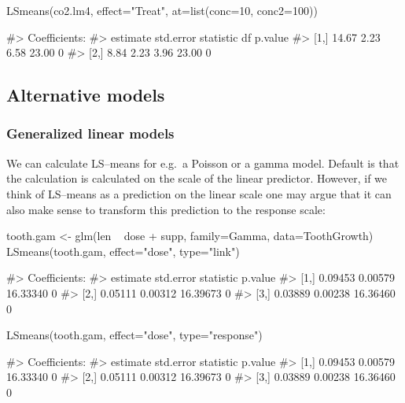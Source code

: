 \begin{Schunk}
\begin{Sinput}
LSmeans(co2.lm4, effect="Treat", at=list(conc=10, conc2=100))
\end{Sinput}
\begin{Soutput}
#> Coefficients:
#>      estimate std.error statistic    df p.value
#> [1,]    14.67      2.23      6.58 23.00       0
#> [2,]     8.84      2.23      3.96 23.00       0
\end{Soutput}
\end{Schunk}

\hypertarget{alternative-models}{%
\subsection{Alternative models}\label{alternative-models}}

\hypertarget{generalized-linear-models}{%
\subsubsection{Generalized linear
models}\label{generalized-linear-models}}

We can calculate LS--means for e.g.~a Poisson or a gamma model. Default
is that the calculation is calculated on the scale of the linear
predictor. However, if we think of LS--means as a prediction on the
linear scale one may argue that it can also make sense to transform this
prediction to the response scale:

\begin{Schunk}
\begin{Sinput}
tooth.gam <- glm(len ~ dose + supp, family=Gamma, data=ToothGrowth)
LSmeans(tooth.gam, effect="dose", type="link")
\end{Sinput}
\begin{Soutput}
#> Coefficients:
#>      estimate std.error statistic p.value
#> [1,]  0.09453   0.00579  16.33340       0
#> [2,]  0.05111   0.00312  16.39673       0
#> [3,]  0.03889   0.00238  16.36460       0
\end{Soutput}
\begin{Sinput}
LSmeans(tooth.gam, effect="dose", type="response")
\end{Sinput}
\begin{Soutput}
#> Coefficients:
#>      estimate std.error statistic p.value
#> [1,]  0.09453   0.00579  16.33340       0
#> [2,]  0.05111   0.00312  16.39673       0
#> [3,]  0.03889   0.00238  16.36460       0
\end{Soutput}
\end{Schunk}

